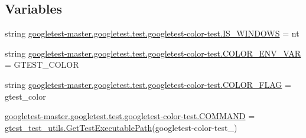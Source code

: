 \subsection*{Variables}
\begin{DoxyCompactItemize}
\item 
string \mbox{\hyperlink{namespacegoogletest-master_1_1googletest_1_1test_1_1googletest-color-test_a0e939442aec228b09266c46412c9898c}{googletest-\/master.\+googletest.\+test.\+googletest-\/color-\/test.\+I\+S\+\_\+\+W\+I\+N\+D\+O\+WS}} = \textquotesingle{}nt\textquotesingle{}
\item 
string \mbox{\hyperlink{namespacegoogletest-master_1_1googletest_1_1test_1_1googletest-color-test_aa9067274582395e388db99aca2ba99a9}{googletest-\/master.\+googletest.\+test.\+googletest-\/color-\/test.\+C\+O\+L\+O\+R\+\_\+\+E\+N\+V\+\_\+\+V\+AR}} = \textquotesingle{}G\+T\+E\+S\+T\+\_\+\+C\+O\+L\+OR\textquotesingle{}
\item 
string \mbox{\hyperlink{namespacegoogletest-master_1_1googletest_1_1test_1_1googletest-color-test_a0c255e8c6876e0b8d6115eb8d9ad6250}{googletest-\/master.\+googletest.\+test.\+googletest-\/color-\/test.\+C\+O\+L\+O\+R\+\_\+\+F\+L\+AG}} = \textquotesingle{}gtest\+\_\+color\textquotesingle{}
\item 
\mbox{\hyperlink{namespacegoogletest-master_1_1googletest_1_1test_1_1googletest-color-test_a64cde85fa1a956c6b233bcd0f1405882}{googletest-\/master.\+googletest.\+test.\+googletest-\/color-\/test.\+C\+O\+M\+M\+A\+ND}} = \mbox{\hyperlink{namespacegtest__test__utils_a89ed3717984a80ffbb7a9c92f71b86a2}{gtest\+\_\+test\+\_\+utils.\+Get\+Test\+Executable\+Path}}(\textquotesingle{}googletest-\/color-\/test\+\_\+\textquotesingle{})
\end{DoxyCompactItemize}
